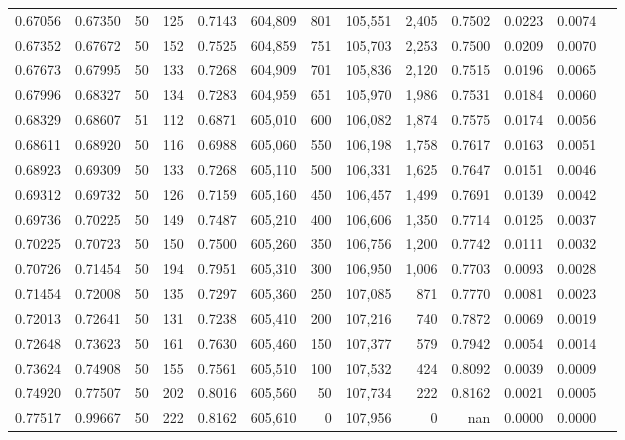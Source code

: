 \begin{tabular}{rrrrrrrrrrrrr}
0.67056 & 0.67350 &    50 & 125 &                                     0.7143 & 604,809 &     801 & 105,551 &   2,405 & 0.7502 & 0.0223 & 0.0074 \\
0.67352 & 0.67672 &    50 & 152 &                                     0.7525 & 604,859 &     751 & 105,703 &   2,253 & 0.7500 & 0.0209 & 0.0070 \\
0.67673 & 0.67995 &    50 & 133 &                                     0.7268 & 604,909 &     701 & 105,836 &   2,120 & 0.7515 & 0.0196 & 0.0065 \\
0.67996 & 0.68327 &    50 & 134 &                                     0.7283 & 604,959 &     651 & 105,970 &   1,986 & 0.7531 & 0.0184 & 0.0060 \\
0.68329 & 0.68607 &    51 & 112 &                                     0.6871 & 605,010 &     600 & 106,082 &   1,874 & 0.7575 & 0.0174 & 0.0056 \\
0.68611 & 0.68920 &    50 & 116 &                                     0.6988 & 605,060 &     550 & 106,198 &   1,758 & 0.7617 & 0.0163 & 0.0051 \\
0.68923 & 0.69309 &    50 & 133 &                                     0.7268 & 605,110 &     500 & 106,331 &   1,625 & 0.7647 & 0.0151 & 0.0046 \\
0.69312 & 0.69732 &    50 & 126 &                                     0.7159 & 605,160 &     450 & 106,457 &   1,499 & 0.7691 & 0.0139 & 0.0042 \\
0.69736 & 0.70225 &    50 & 149 &                                     0.7487 & 605,210 &     400 & 106,606 &   1,350 & 0.7714 & 0.0125 & 0.0037 \\
0.70225 & 0.70723 &    50 & 150 &                                     0.7500 & 605,260 &     350 & 106,756 &   1,200 & 0.7742 & 0.0111 & 0.0032 \\
0.70726 & 0.71454 &    50 & 194 &                                     0.7951 & 605,310 &     300 & 106,950 &   1,006 & 0.7703 & 0.0093 & 0.0028 \\
0.71454 & 0.72008 &    50 & 135 &                                     0.7297 & 605,360 &     250 & 107,085 &     871 & 0.7770 & 0.0081 & 0.0023 \\
0.72013 & 0.72641 &    50 & 131 &                                     0.7238 & 605,410 &     200 & 107,216 &     740 & 0.7872 & 0.0069 & 0.0019 \\
0.72648 & 0.73623 &    50 & 161 &                                     0.7630 & 605,460 &     150 & 107,377 &     579 & 0.7942 & 0.0054 & 0.0014 \\
0.73624 & 0.74908 &    50 & 155 &                                     0.7561 & 605,510 &     100 & 107,532 &     424 & 0.8092 & 0.0039 & 0.0009 \\
0.74920 & 0.77507 &    50 & 202 &                                     0.8016 & 605,560 &      50 & 107,734 &     222 & 0.8162 & 0.0021 & 0.0005 \\
0.77517 & 0.99667 &    50 & 222 &                                     0.8162 & 605,610 &       0 & 107,956 &       0 &    nan & 0.0000 & 0.0000 \\
\bottomrule
\end{tabular}
